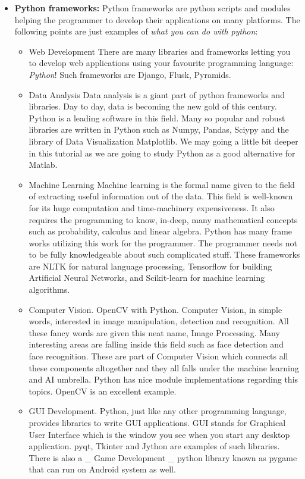 \documentclass[11pt]{article}
\providecommand{\tightlist}{%
      \setlength{\itemsep}{0pt}\setlength{\parskip}{0pt}}
\begin{document}
    \begin{itemize}
\tightlist
\item
  \textbf{Python frameworks:} Python frameworks are python scripts and
  modules helping the programmer to develop their applications on many
  platforms. The following points are just examples of \emph{what you
  can do with python}:

  \begin{itemize}
  \tightlist
  \item
    Web Development There are many libraries and frameworks letting you
    to develop web applications using your favourite programming
    language: \emph{Python}! Such frameworks are Django, Flusk,
    Pyramids.
  \item
    Data Analysis Data analysis is a giant part of python frameworks and
    libraries. Day to day, data is becoming the new gold of this
    century. Python is a leading software in this field. Many so popular
    and robust libraries are written in Python such as Numpy, Pandas,
    Sciypy and the library of Data Visualization Matplotlib. We may
    going a little bit deeper in this tutorial as we are going to study
    Python as a good alternative for Matlab.
  \item
    Machine Learning Machine learning is the formal name given to the
    field of extracting useful information out of the data. This field
    is well-known for its huge computation and time-machinery
    expensiveness. It also requires the programming to know, in-deep,
    many mathematical concepts such as probability, calculus and linear
    algebra. Python has many frame works utilizing this work for the
    programmer. The programmer needs not to be fully knowledgeable about
    such complicated stuff. These frameworks are NLTK for natural
    language processing, Tensorflow for building Artificial Neural
    Networks, and Scikit-learn for machine learning algorithms.
  \item
    Computer Vision. OpenCV with Python. Computer Vision, in simple
    words, interested in image manipulation, detection and recognition.
    All these fancy words are given this neat name, Image Processing.
    Many interesting areas are falling inside this field such as face
    detection and face recognition. These are part of Computer Vision
    which connects all these components altogether and they all falls
    under the machine learning and AI umbrella. Python has nice module
    implementations regarding this topics. OpenCV is an excellent
    example.
  \item
    GUI Development. Python, just like any other programming language,
    provides libraries to write GUI applications. GUI stands for
    Graphical User Interface which is the window you see when you start
    any desktop application. pyqt, Tkinter and Jython are examples of
    such libraries. There is also a \_ Game Development \_ python
    library known as pygame that can run on Android system as well.
  \end{itemize}
\end{itemize}
\end{document}
